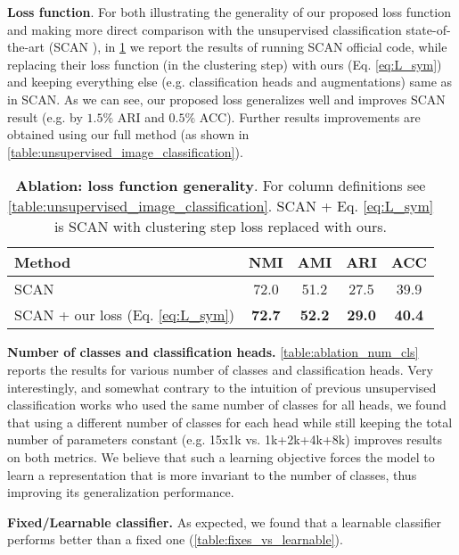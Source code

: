 \documentclass[runningheads]{llncs}
\begin{document}
\textbf{Loss function}. 
For both illustrating the generality of our proposed loss function and making more direct comparison with the unsupervised classification state-of-the-art (SCAN \cite{van2020scan}), in \cref{table:ablation_loss} we report the results of running SCAN official code, while replacing their loss function (in the clustering step) with ours (Eq. \eqref{eq:L_sym}) and keeping everything else (e.g. classification heads and augmentations) same as in SCAN. As we can see, our proposed loss generalizes well and improves SCAN result (e.g. by $1.5\%$ ARI and $0.5\%$ ACC). Further results improvements are obtained using our full method (as shown in \cref{table:unsupervised_image_classification}).

\begin{table}[bt]
  \centering
  \setlength\tabcolsep{4pt}
    \caption{\textbf{Ablation: loss function generality}. 
    For column definitions see \cref{table:unsupervised_image_classification}. 
    SCAN + Eq. \eqref{eq:L_sym} is SCAN with clustering step loss replaced with ours.
    }
  \label{table:ablation_loss}
  \begin{tabular}{lcccc}
    \toprule
    Method & NMI & AMI & ARI & ACC \\
    \midrule
    SCAN \cite{van2020scan} & 72.0 & 51.2 & 27.5 & 39.9 \\
    SCAN + our loss (Eq. \eqref{eq:L_sym}) & \textbf{72.7} & \textbf{52.2} & \textbf{29.0} & \textbf{40.4} \\
    \bottomrule
  \end{tabular}
\end{table}

\textbf{Number of classes and classification heads.} \cref{table:ablation_num_cls} reports the results for various number of classes and classification heads. 
Very interestingly, and somewhat contrary to the intuition of previous unsupervised classification works \cite{van2020scan,YM.2020Self-labelling} who used the same number of classes for all heads, 
we found that using a different number of classes for each head while still keeping the total number of parameters constant (e.g. 15x1k vs. 1k+2k+4k+8k) improves results on both metrics. We believe that such a learning objective forces the model to learn a representation that is more invariant to the number of classes, thus improving its generalization performance. 

\textbf{Fixed/Learnable classifier.} As expected, we found that a learnable classifier performs better than a fixed one (\cref{table:fixes_vs_learnable}).
\end{document}

